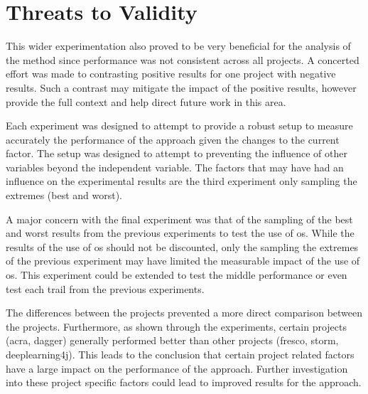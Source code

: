 \section{Threats to Validity}
\label{sec:threat_validity}

This wider experimentation also proved to be very beneficial for the analysis of the method since performance was not consistent across all projects. A concerted effort was made to contrasting positive results for one project with negative results. Such a contrast may mitigate the impact of the positive results, however provide the full context and help direct future work in this area.

Each experiment was designed to attempt to provide a robust setup to measure accurately the performance of the approach given the changes to the current factor. The setup was designed to attempt to preventing the influence of other variables beyond the independent variable. The factors that may have had an influence on the experimental results are the third experiment only sampling the extremes (best and worst).

A major concern with the final experiment was that of the sampling of the best and worst results from the previous experiments to test the use of \gls{os}. While the results of the use of \gls{os} should not be discounted, only the sampling the extremes of the previous experiment may have limited the measurable impact of the use of \gls{os}. This experiment could be extended to test the middle performance or even test each trail from the previous experiments.

The differences between the projects prevented a more direct comparison between the projects. Furthermore, as shown through the experiments, certain projects (acra, dagger) generally performed better than other projects (fresco, storm, deeplearning4j). This leads to the conclusion that certain project related factors have a large impact on the performance of the approach. Further investigation into these project specific factors could lead to improved results for the approach.